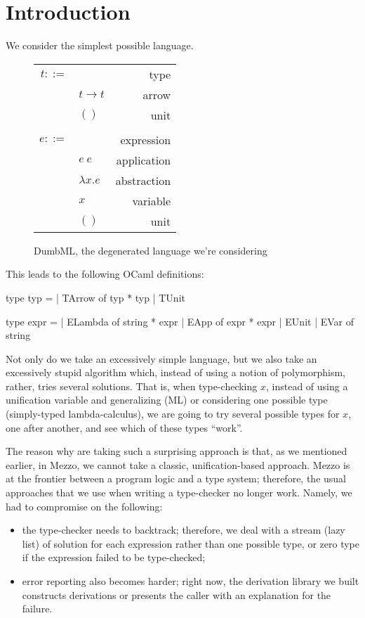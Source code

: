 \section{Introduction}

We consider the simplest possible language.

\begin{figure}[h]
  \begin{tabularx}{\columnwidth}{rlR}
    $t ::=$ & & type \\
            & $t \to t$       & arrow \\
            & $()$            & unit \\
      \\[1ex]
    $e ::=$ & & expression \\
            & $e \ e$         & application \\
            & $\lambda x.e $  & abstraction \\
            & $x$             & variable \\
            & $()$            & unit \\
  \end{tabularx}
  \caption{DumbML, the degenerated language we're considering}
  \label{fig:syntax}
\end{figure}

This leads to the following OCaml definitions:

\begin{ocamlcode}
type typ =
  | TArrow of typ * typ
  | TUnit

type expr =
  | ELambda of string * expr
  | EApp of expr * expr
  | EUnit
  | EVar of string
\end{ocamlcode}

Not only do we take an excessively simple language, but we also take an
excessively stupid algorithm which, instead of using a notion of polymorphism,
rather, tries several solutions. That is, when type-checking $x$, instead of
using a unification variable and generalizing (ML) or considering one possible
type (simply-typed lambda-calculus), we are going to try several possible types
for $x$, one after another, and see which of these types ``work''.

The reason why are taking such a surprising approach is that, as we mentioned
earlier, in Mezzo, we cannot take a classic, unification-based approach. Mezzo
is at the frontier between a program logic and a type system; therefore, the
usual approaches that we use when writing a type-checker no longer work. Namely,
we had to compromise on the following:
\begin{itemize}
  \item the type-checker needs to backtrack; therefore, we deal with a stream
    (lazy list) of solution for each expression rather than one possible type,
    or zero type if the expression failed to be type-checked;
  \item error reporting also becomes harder; right now, the derivation library
    we built constructs derivations or presents the caller with an explanation
    for the failure.
\end{itemize}
